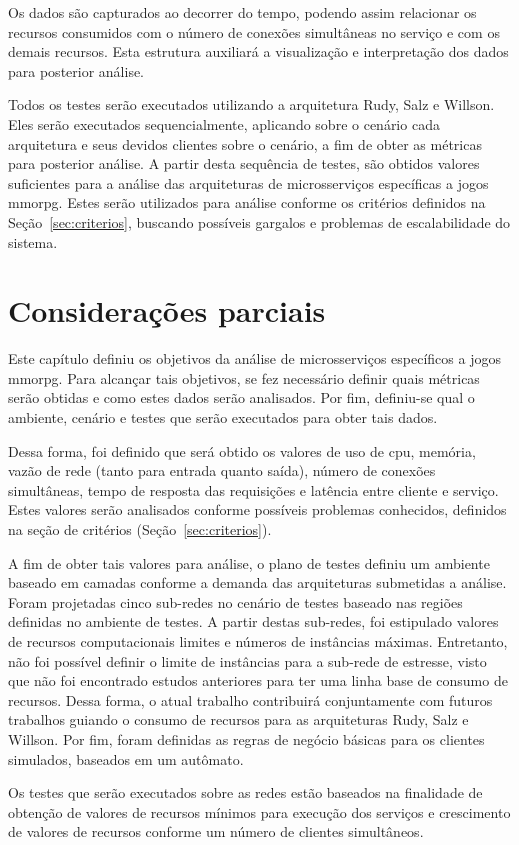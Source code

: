 Os dados são capturados ao decorrer do tempo, podendo assim relacionar os recursos consumidos com o número de conexões simultâneas no serviço e com os demais recursos.
%
Esta estrutura auxiliará a visualização e interpretação dos dados para posterior análise.

Todos os testes serão executados utilizando a arquitetura Rudy, Salz e Willson.
%
Eles serão executados sequencialmente, aplicando sobre o cenário cada arquitetura e seus devidos clientes sobre o cenário, a fim de obter as métricas para posterior análise.
%
A partir desta sequência de testes, são obtidos valores suficientes para a análise das arquiteturas de microsserviços específicas a jogos \ac{mmorpg}.
%
Estes serão utilizados para análise conforme os critérios definidos na Seção~\ref{sec:criterios}, buscando possíveis gargalos e problemas de escalabilidade do sistema.


\section{Considerações parciais}


Este capítulo definiu os objetivos da análise de microsserviços específicos a jogos \ac{mmorpg}.
%
Para alcançar tais objetivos, se fez necessário definir quais métricas serão obtidas e como estes dados serão analisados.
%
Por fim, definiu-se qual o ambiente, cenário e testes que serão executados para obter tais dados.

Dessa forma, foi definido que será obtido os valores de uso de \ac{cpu}, memória, vazão de rede (tanto para entrada quanto saída), número de conexões simultâneas, tempo de resposta das requisições e latência entre cliente e serviço.
%
Estes valores serão analisados conforme possíveis problemas conhecidos, definidos na seção de critérios (Seção~\ref{sec:criterios}).

A fim de obter tais valores para análise, o plano de testes definiu um ambiente baseado em camadas conforme a demanda das arquiteturas submetidas a análise.
%
Foram projetadas cinco sub-redes no cenário de testes baseado nas regiões definidas no ambiente de testes.
%
A partir destas sub-redes, foi estipulado valores de recursos computacionais limites e números de instâncias máximas.
%
Entretanto, não foi possível definir o limite de instâncias para a sub-rede de estresse, visto que não foi encontrado estudos anteriores para ter uma linha base de consumo de recursos.
%
Dessa forma, o atual trabalho contribuirá conjuntamente com futuros trabalhos guiando o consumo de recursos para as arquiteturas Rudy, Salz e Willson.
%
Por fim, foram definidas as regras de negócio básicas para os clientes simulados, baseados em um autômato.

Os testes que serão executados sobre as redes estão baseados na finalidade de obtenção de valores de recursos mínimos para execução dos serviços e crescimento de valores de recursos conforme um número de clientes simultâneos.
